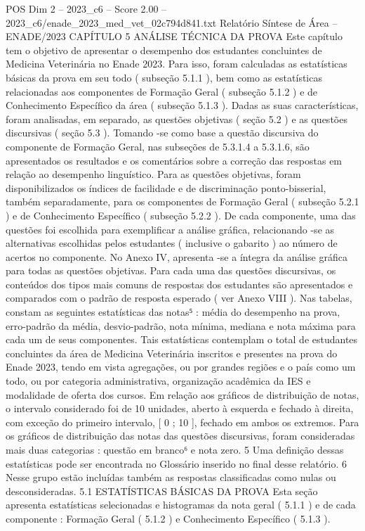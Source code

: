 \begin{textsample}{POS Dim 2 – 2023\_c6 – Score 2.00 – 2023\_c6/enade\_2023\_med\_vet\_02c794d841.txt}  \label{ex:f2_pos_170}
Relatório Síntese de Área – ENADE/2023 CAPÍTULO 5 ANÁLISE TÉCNICA DA PROVA Este capítulo tem o objetivo de apresentar o desempenho dos estudantes concluintes de Medicina Veterinária no Enade 2023.
Para isso, foram calculadas as estatísticas básicas da prova em seu todo ( subseção 5.1.1 ), bem como as estatísticas relacionadas aos componentes de Formação Geral ( subseção 5.1.2 ) e de Conhecimento Específico da área ( subseção 5.1.3 ).
Dadas as suas características, foram analisadas, em separado, as questões objetivas ( seção 5.2 ) e as questões discursivas ( seção 5.3 ).
Tomando -se como base a questão discursiva do componente de Formação Geral, nas subseções de 5.3.1.4 a 5.3.1.6, são apresentados os resultados e os comentários sobre a correção das respostas em relação ao desempenho linguístico.
Para as questões objetivas, foram disponibilizados os índices de facilidade e de discriminação ponto-bisserial, também separadamente, para os componentes de Formação Geral ( subseção 5.2.1 ) e de Conhecimento Específico ( subseção 5.2.2 ).
De cada componente, uma das questões foi escolhida para exemplificar a análise gráfica, relacionando -se as alternativas escolhidas pelos estudantes ( inclusive o gabarito ) ao número de acertos no componente.
No Anexo IV, apresenta -se a íntegra da análise gráfica para todas as questões objetivas.
Para cada uma das questões discursivas, os conteúdos dos tipos mais comuns de respostas dos estudantes são apresentados e comparados com o padrão de resposta esperado ( ver Anexo VIII ).
Nas tabelas, constam as seguintes estatísticas das notas⁵ : média do desempenho na prova, erro-padrão da média, desvio-padrão, nota mínima, mediana e nota máxima para cada um de seus componentes.
Tais estatísticas contemplam o total de estudantes concluintes da área de Medicina Veterinária inscritos e presentes na prova do Enade 2023, tendo em vista agregações, ou por grandes regiões e o país como um todo, ou por categoria administrativa, organização acadêmica da IES e modalidade de oferta dos cursos.
Em relação aos gráficos de distribuição de notas, o intervalo considerado foi de 10 unidades, aberto à esquerda e fechado à direita, com exceção do primeiro intervalo, [ 0 ; 10 ], fechado em ambos os extremos.
Para os gráficos de distribuição das notas das questões discursivas, foram consideradas mais duas categorias : questão em branco⁶ e nota zero. 5 Uma definição dessas estatísticas pode ser encontrada no Glossário inserido no final desse relatório. 6 Nesse grupo estão incluídas também as respostas classificadas como nulas ou desconsideradas. 5.1 ESTATÍSTICAS BÁSICAS DA PROVA Esta seção apresenta estatísticas selecionadas e histogramas da nota geral ( 5.1.1 ) e de cada componente : Formação Geral ( 5.1.2 ) e Conhecimento Específico ( 5.1.3 ).

\end{textsample}
